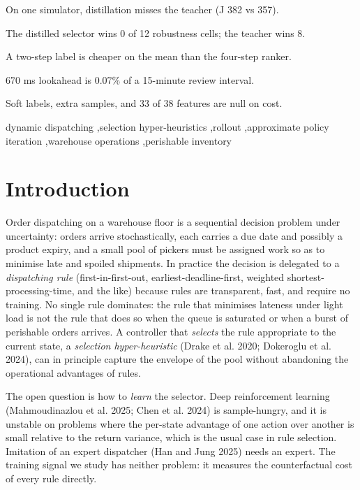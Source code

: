 \documentclass[review,3p,times]{elsarticle}
\theoremstyle{definition}
\begin{document}
\begin{frontmatter}
\begin{highlights}
\item On one simulator, distillation misses the teacher (J 382 vs 357).
\item The distilled selector wins 0 of 12 robustness cells; the teacher wins 8.
\item A two-step label is cheaper on the mean than the four-step ranker.
\item 670 ms lookahead is 0.07\% of a 15-minute review interval.
\item Soft labels, extra samples, and 33 of 38 features are null on cost.
\end{highlights}

\begin{keyword}
dynamic dispatching \sep selection
hyper-heuristics \sep rollout \sep approximate policy
iteration \sep warehouse operations \sep perishable inventory
\end{keyword}

\end{frontmatter}

\section{Introduction}\label{introduction}

Order dispatching on a warehouse floor is a sequential decision problem
under uncertainty: orders arrive stochastically, each carries a due date
and possibly a product expiry, and a small pool of pickers must be
assigned work so as to minimise late and spoiled shipments. In practice
the decision is delegated to a \emph{dispatching rule}
(first-in-first-out, earliest-deadline-first, weighted
shortest-processing-time, and the like) because rules are transparent,
fast, and require no training. No single rule dominates: the rule that
minimises lateness under light load is not the rule that does so when
the queue is saturated or when a burst of perishable orders arrives. A
controller that \emph{selects} the rule appropriate to the current
state, a \emph{selection hyper-heuristic} (Drake et al. 2020; Dokeroglu
et al. 2024), can in principle capture the envelope of the pool without
abandoning the operational advantages of rules.

The open question is how to \emph{learn} the selector. Deep
reinforcement learning (Mahmoudinazlou et al. 2025; Chen et al. 2024) is
sample-hungry, and it is unstable on problems where the per-state
advantage of one action over another is small relative to the return
variance, which is the usual case in rule selection. Imitation of an
expert dispatcher (Han and Jung 2025) needs an expert. The training
signal we study has neither problem: it measures the counterfactual cost
of every rule directly.
\end{document}

